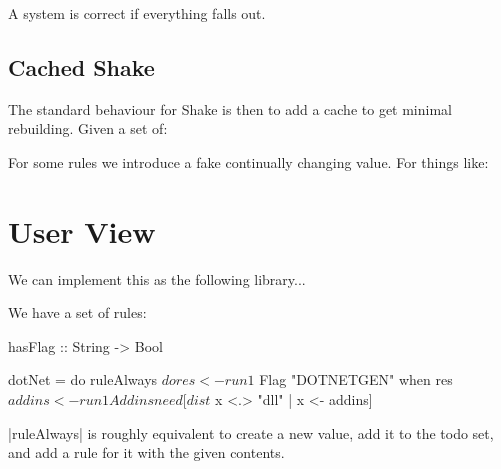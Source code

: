 \documentclass{sigplanconf}
\begin{document}
A system is correct if everything falls out.

\subsection{Cached Shake}

The standard behaviour for Shake is then to add a cache to get minimal rebuilding. Given a set of:

For some rules we introduce a fake continually changing value. For things like:


\section{User View}

We can implement this as the following library...

We have a set of rules:


\begin{code}

hasFlag :: String -> Bool

dotNet = do
    ruleAlways $ do
        res <- run1 $ Flag "DOTNETGEN"
        when res $
            addins <- run1 Addins
            need [dist $ x <.> "dll" | x <- addins]
\end{code}

|ruleAlways| is roughly equivalent to create a new value, add it to the todo set, and add a rule for it with the given contents.
\end{document}
